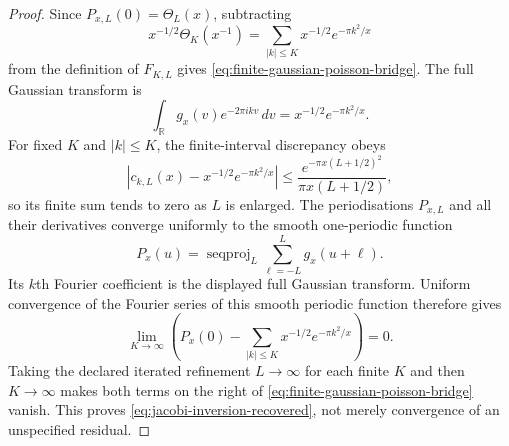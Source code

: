 \documentclass[11pt,a4paper]{article}
\theoremstyle{definition}
\newcommand{\SeqProj}{\operatorname{seqproj}}
\begin{document}
\begin{proof}
Since $P_{x,L}(0)=\Theta_L(x)$, subtracting
\[
  x^{-1/2}\Theta_K(x^{-1})
  =\sum_{|k|\leq K}x^{-1/2}e^{-\pi k^2/x}
\]
from the definition of $F_{K,L}$ gives
\cref{eq:finite-gaussian-poisson-bridge}. The full Gaussian transform is
\[
  \int_{\mathbb R}g_x(v)e^{-2\pi ikv}\,dv
  =x^{-1/2}e^{-\pi k^2/x}.
\]
For fixed $K$ and $|k|\leq K$, the finite-interval discrepancy obeys
\[
  \left|
    c_{k,L}(x)-x^{-1/2}e^{-\pi k^2/x}
  \right|
  \leq
  \frac{e^{-\pi x(L+1/2)^2}}{\pi x(L+1/2)},
\]
so its finite sum tends to zero as $L$ is enlarged. The periodisations
$P_{x,L}$ and all their derivatives converge uniformly to the smooth
one-periodic function
\[
  P_x(u)=\SeqProj_L\sum_{\ell=-L}^{L}g_x(u+\ell).
\]
Its $k$th Fourier coefficient is the displayed full Gaussian transform.
Uniform convergence of the Fourier series of this smooth periodic function
therefore gives
\[
  \lim_{K\to\infty}
  \left(
    P_x(0)-\sum_{|k|\leq K}x^{-1/2}e^{-\pi k^2/x}
  \right)=0.
\]
Taking the declared iterated refinement $L\to\infty$ for each finite $K$ and
then $K\to\infty$ makes both terms on the right of
\cref{eq:finite-gaussian-poisson-bridge} vanish. This proves
\cref{eq:jacobi-inversion-recovered}, not merely convergence of an unspecified
residual.
\end{proof}
\end{document}
